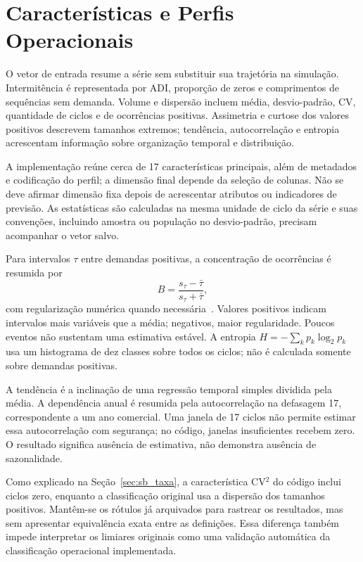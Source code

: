 \section{Características e Perfis Operacionais}
\label{sec:carac_series}

O vetor de entrada resume a série sem substituir sua trajetória na simulação. Intermitência é representada por ADI, proporção de zeros e comprimentos de sequências sem demanda. Volume e dispersão incluem média, desvio-padrão, CV, quantidade de ciclos e de ocorrências positivas. Assimetria e curtose dos valores positivos descrevem tamanhos extremos; tendência, autocorrelação e entropia acrescentam informação sobre organização temporal e distribuição.

A implementação reúne cerca de 17 características principais, além de metadados e codificação do perfil; a dimensão final depende da seleção de colunas. Não se deve afirmar dimensão fixa depois de acrescentar atributos ou indicadores de previsão. As estatísticas são calculadas na mesma unidade de ciclo da série e suas convenções, incluindo amostra ou população no desvio-padrão, precisam acompanhar o vetor salvo.

Para intervalos $\tau$ entre demandas positivas, a concentração de ocorrências é resumida por
\[
B=\frac{s_\tau-\bar\tau}{s_\tau+\bar\tau},
\]
com regularização numérica quando necessária~\citep{GohBarabasi2008Burstiness}. Valores positivos indicam intervalos mais variáveis que a média; negativos, maior regularidade. Poucos eventos não sustentam uma estimativa estável. A entropia $H=-\sum_kp_k\log_2p_k$ usa um histograma de dez classes sobre todos os ciclos; não é calculada somente sobre demandas positivas.

A tendência é a inclinação de uma regressão temporal simples dividida pela média. A dependência anual é resumida pela autocorrelação na defasagem 17, correspondente a um ano comercial. Uma janela de 17 ciclos não permite estimar essa autocorrelação com segurança; no código, janelas insuficientes recebem zero. O resultado significa ausência de estimativa, não demonstra ausência de sazonalidade.

Como explicado na Seção~\ref{sec:sb_taxa}, a característica CV$^2$ do código inclui ciclos zero, enquanto a classificação original usa a dispersão dos tamanhos positivos. Mantêm-se os rótulos já arquivados para rastrear os resultados, mas sem apresentar equivalência exata entre as definições. Essa diferença também impede interpretar os limiares originais como uma validação automática da classificação operacional implementada.

